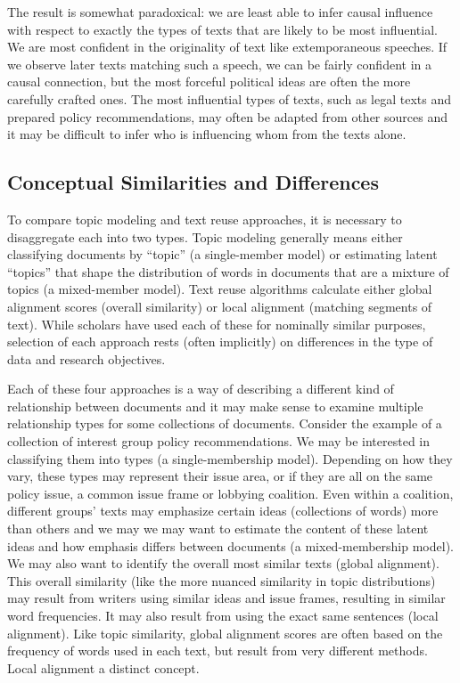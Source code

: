 \documentclass{article}
\begin{document}
The result is somewhat paradoxical: we are least able to infer causal influence with respect to exactly the types of texts that are likely to be most influential. We are most confident in the originality of text like extemporaneous speeches. If we observe later texts matching such a speech, we can be fairly confident in a causal connection, but the most forceful political ideas are often the more carefully crafted ones. The most influential types of texts, such as legal texts and prepared policy recommendations, may often be adapted from other sources and it may be difficult to infer who is influencing whom from the texts alone.

\subsection{Conceptual Similarities and Differences}
To compare topic modeling and text reuse approaches, it is necessary to disaggregate each into two types. Topic modeling generally means either classifying documents by ``topic'' (a single-member model) or estimating latent ``topics'' that shape the distribution of words in documents that are a mixture of topics (a mixed-member model). Text reuse algorithms calculate either global alignment scores (overall similarity) or local alignment (matching segments of text). While scholars have used each of these for nominally similar purposes, selection of each approach rests (often implicitly) on differences in the type of data and research objectives. 

Each of these four approaches is a way of describing a different kind of relationship between documents and it may make sense to examine multiple relationship types for some collections of documents. Consider the example of a collection of interest group policy recommendations. We may be interested in classifying them into types (a single-membership model). Depending on how they vary, these types may represent their issue area, or if they are all on the same policy issue, a common issue frame or lobbying coalition. Even within a coalition, different groups' texts may emphasize certain ideas (collections of words) more than others and we may we may want to estimate the content of these latent ideas and how emphasis differs between documents (a mixed-membership model). We may also want to identify the overall most similar texts (global alignment). This overall similarity (like the more nuanced similarity in topic distributions) may result from writers using similar ideas and issue frames, resulting in similar word frequencies. It may also result from using the exact same sentences (local alignment). Like topic similarity, global alignment scores are often based on the frequency of words used in each text, but result from very different methods. Local alignment a distinct concept. 
\end{document}
